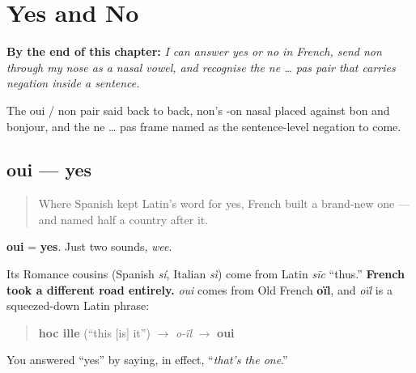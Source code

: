 
\chapter{Yes and No}
\label{ch:fr-yes-and-no}

\begin{chapteropening}
\textbf{By the end of this chapter:} \emph{I can answer yes or no in French, send non through my nose as a nasal vowel, and recognise the ne … pas pair that carries negation inside a sentence.}

The oui / non pair said back to back, non's -on nasal placed against bon and bonjour, and the ne … pas frame named as the sentence-level negation to come.
\end{chapteropening}

\section[oui]{oui — yes}

\label{lesson:FR-C18-oui}



\begin{quote}
Where Spanish kept Latin's word for yes, French built a brand-new one — and named half a country after it.
\end{quote}

\begin{cousinweb}
\textbf{oui} = \textbf{yes}. Just two sounds, \emph{wee}.

Its Romance cousins (Spanish \emph{sí}, Italian \emph{sì}) come from Latin \emph{sīc} \textquotedblleft{}thus.\textquotedblright{} \textbf{French took a different road entirely.} \emph{oui} comes from Old French \textbf{oïl}, and \emph{oïl} is a squeezed-down Latin phrase:

\begin{quote}
\textbf{hoc ille} (\textquotedblleft{}this {[}is{]} it\textquotedblright{}) $\to$ \emph{o-ïl} $\to$ \textbf{oui}
\end{quote}

You answered \textquotedblleft{}yes\textquotedblright{} by saying, in effect, \textquotedblleft{}\emph{that's the one}.\textquotedblright{}
\end{cousinweb}

